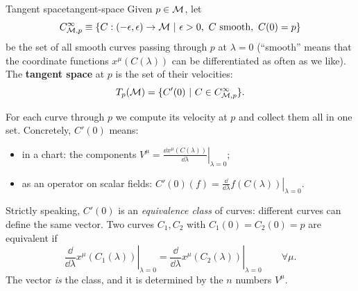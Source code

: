 \begin{definition}{Tangent space}{tangent-space}
Given $p\in\mathcal{M}$, let
\[
  C^\infty_{\M,p}\equiv\{C:(-\epsilon,\epsilon)\to\M\ |\ \epsilon>0,\ C\ \text{smooth},\ C(0)=p\}
\]
be the set of all smooth curves passing through $p$ at $\lambda=0$ (``smooth'' means that the coordinate functions $x^\mu(C(\lambda))$ can be differentiated as often as we like). The \textbf{tangent space} at $p$ is the set of their velocities:
\begin{equation}
  T_p(\mathcal{M})=\{C'(0)\ |\ C\in C^\infty_{\mathcal{M},p}\}.
\end{equation}
\end{definition}
For each curve through $p$ we compute its velocity at $p$ and collect them all in one set. Concretely, $C'(0)$ means:
\begin{itemize}[nosep]
  \item in a chart: the components $V^\mu=\left.\frac{\dd x^\mu(C(\lambda))}{\dd\lambda}\right|_{\lambda=0}$;
  \item as an operator on scalar fields: $C'(0)(f)=\left.\frac{\dd}{\dd\lambda}f(C(\lambda))\right|_{\lambda=0}$.
\end{itemize}
Strictly speaking, $C'(0)$ is an \emph{equivalence class} of curves: different curves can define the same vector. Two curves $C_1,C_2$ with $C_1(0)=C_2(0)=p$ are equivalent if
\begin{equation}
  \left.\frac{\dd}{\dd\lambda}x^\mu(C_1(\lambda))\right|_{\lambda=0}=\left.\frac{\dd}{\dd\lambda}x^\mu(C_2(\lambda))\right|_{\lambda=0}\qquad\forall\mu .
\end{equation}
The vector \emph{is} the class, and it is determined by the $n$ numbers $V^\mu$.


